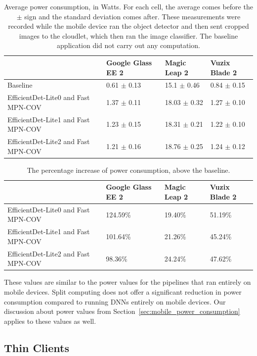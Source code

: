 \begin{table}
\begin{tabular}{|l||l|l|l|}
  \hline
  & Google Glass EE 2 & Magic Leap 2 & Vuzix Blade 2\\
  \hline
  \hline
  Baseline & 0.61 $\pm$ 0.13 & 15.1 $\pm$ 0.46 & 0.84 $\pm$ 0.15\\
  EfficientDet-Lite0 and Fast MPN-COV & 1.37 $\pm$ 0.11 & 18.03 $\pm$ 0.32 & 1.27 $\pm$ 0.10\\
  EfficientDet-Lite1 and Fast MPN-COV & 1.23 $\pm$ 0.15 & 18.31 $\pm$ 0.21 & 1.22 $\pm$ 0.10\\
  EfficientDet-Lite2 and Fast MPN-COV & 1.21 $\pm$ 0.16 & 18.76 $\pm$ 0.25 & 1.24 $\pm$ 0.12\\
  \hline
\end{tabular}
  \caption{
    Average power consumption, in Watts.
    For each cell, the average comes before the $\pm$ sign and the standard
    deviation comes after.
    These measurements were recorded while the mobile device ran the object
    detector and then sent cropped images to the cloudlet, which then ran the
    image classifier.
    The baseline application did not carry out any computation.
  }\label{tab:mobile_power}
\end{table}

\begin{table}
\begin{tabular}{|l||l|l|l|}
  \hline
  & Google Glass EE 2 & Magic Leap 2 & Vuzix Blade 2\\
  \hline
  \hline
  EfficientDet-Lite0 and Fast MPN-COV & 124.59\% & 19.40\% & 51.19\%\\
  EfficientDet-Lite1 and Fast MPN-COV & 101.64\% & 21.26\% & 45.24\%\\
  EfficientDet-Lite2 and Fast MPN-COV & 98.36\% & 24.24\% & 47.62\%\\
  \hline
\end{tabular}
  \caption{
    The percentage increase of power consumption, above the baseline.
  }\label{tab:mobile_power_percentage}
\end{table}

These values are similar to the power values for the pipelines that ran entirely
on mobile devices.
Split computing does not offer a significant reduction in power consumption
compared to running DNNs entirely on mobile devices.
Our discussion about power values from
Section~\ref{sec:mobile_power_consumption} applies to these values as well.

\subsection{Thin Clients}

